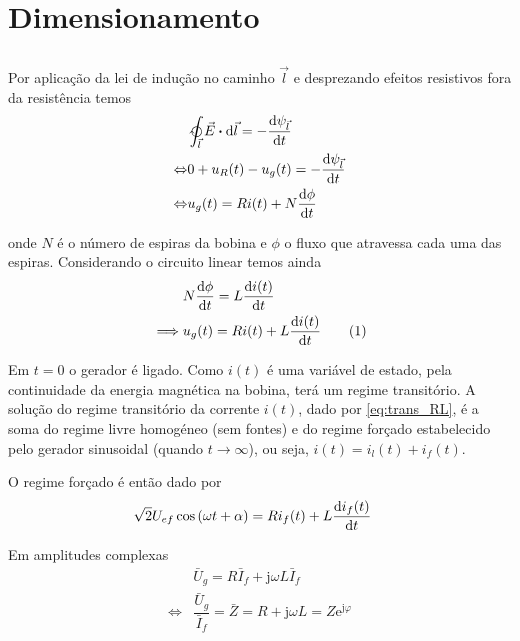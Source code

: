 \documentclass[a4paper, titlepage, portuguese]{article}
\newcommand{\eq}{\Leftrightarrow} %
\newcommand\numberthis{\addtocounter{equation}{1}\tag{\theequation}}
\newcommand\e{\mathrm{e} }
\newcommand\jj{\mathrm{j} }
\begin{document}

	\section{Dimensionamento}
	\subsection{}
	\subsubsection{}
		\par
		Por aplicação da lei de indução no caminho $\vec{l}$ e desprezando efeitos resistivos fora da resistência temos
		\begin{align*}
			&\ointclockwise_{\vec{l}} \vec{E} \vdot \dd{\vec{l}} = - \dv{\psi_{\vec{l}}}{t} \\ \eq
			&0 + u_R(t) - u_g(t) = - \dv{\psi_{\vec{l}}}{t} \\ \eq
			&u_g(t) = Ri(t) + N \dv{\phi}{t}
		\end{align*}
		\par
		onde $N$ é o número de espiras da bobina e $\phi$ o fluxo que atravessa cada uma das espiras. Considerando o circuito linear temos ainda
		\begin{align*}
			&N \dv{\phi}{t} = L \dv{i(t)}{t} \\ \implies
			&u_g(t) = Ri(t) + L \dv{i(t)}{t} \numberthis \label{eq:trans_RL}
		\end{align*}
		\par
		Em $t = 0$ o gerador é ligado. Como $i(t)$ é uma variável de estado, pela continuidade da energia magnética na bobina, terá um regime transitório. A solução do regime transitório da corrente $i(t)$, dado por \eqref{eq:trans_RL}, é a soma do regime livre homogéneo (sem fontes) e do regime forçado estabelecido pelo gerador sinusoidal (quando $t \to \infty$), ou seja, $i(t) = i_l(t) + i_f(t)$.
		\par
		O regime forçado é então dado por
		\begin{align*}
			&\sqrt{2}U_{ef}\cos\left(\omega t + \alpha\right) = Ri_f(t) + L \dv{i_f(t)}{t}
		\end{align*}
		\par
		Em amplitudes complexas
		\begin{align*}
			&\bar{U}_g = R\bar{I}_f + \jj \omega L\bar{I}_f \\ \eq
			&\dfrac{\bar{U}_g}{\bar{I}_f} = \bar{Z} = R + \jj \omega L = Z\e^{\jj\varphi}
		\end{align*}
\end{document}
